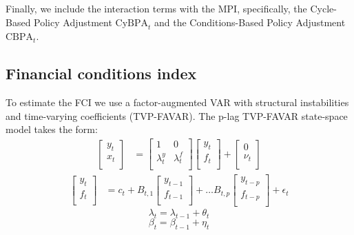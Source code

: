 Finally, we include the interaction terms with the MPI, specifically, the Cycle-Based Policy Adjustment $\text{CyBPA}_t$ and the Conditions-Based Policy Adjustment $\text{CBPA}_t$.

\subsection{Financial conditions index}
To estimate the FCI we use a factor-augmented VAR with structural instabilities and time-varying coefficients (TVP-FAVAR). The p-lag TVP-FAVAR \citep{koop_2013} state-space model takes the form:
\begin{align}
    \label{eq:tvpfavar_design}
    \begin{bmatrix}
        y_t \\
        x_t \\
    \end{bmatrix} &= 
    \begin{bmatrix}
        1 & 0 \\
        \lambda_t^y & \lambda_t^f \\
    \end{bmatrix}
    \begin{bmatrix}
        y_t \\
        f_t \\
    \end{bmatrix} +
    \begin{bmatrix}
        0 \\
        \nu_t \\
    \end{bmatrix}
\end{align}
\begin{align}
    \label{eq:tvpfavar_transition}
    \begin{bmatrix}
        y_t \\
        f_t \\
    \end{bmatrix} &=
    c_t +
    B_{t,1}
    \begin{bmatrix}
        y_{t-1} \\
        f_{t-1} \\
    \end{bmatrix} + \dots
    B_{t,p}
    \begin{bmatrix}
        y_{t-p} \\
        f_{t-p} \\
    \end{bmatrix} + \epsilon_t
\end{align}
\begin{equation}
    \label{eq:tvpfavar_design_coeff}
    \lambda_t = \lambda_{t-1} + \theta_t
\end{equation}
\begin{equation}
    \label{eq:tvpfavar_transition_coeff}
    \beta_t = \beta_{t-1} + \eta_t
\end{equation}

